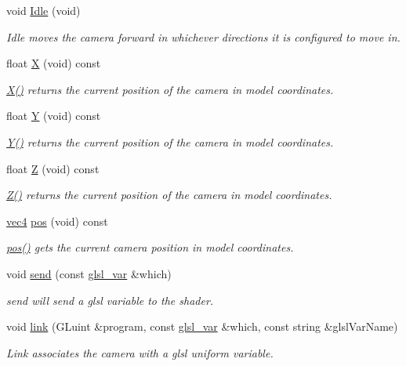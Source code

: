\begin{DoxyCompactItemize}
void \hyperlink{class_camera_aec3559fe43597656629fdb00157d3c73}{\-Idle} (void)
\begin{DoxyCompactList}\small\item\em \-Idle moves the camera forward in whichever directions it is configured to move in. \end{DoxyCompactList}\item 
float \hyperlink{class_camera_a2f7fd64d5d6e0dfb5edcca53c7d15994}{\-X} (void) const 
\begin{DoxyCompactList}\small\item\em \hyperlink{class_camera_a2f7fd64d5d6e0dfb5edcca53c7d15994}{\-X()} returns the current position of the camera in model coordinates. \end{DoxyCompactList}\item 
float \hyperlink{class_camera_a37529ef93871f547ebfd5862bc6cce62}{\-Y} (void) const 
\begin{DoxyCompactList}\small\item\em \hyperlink{class_camera_a37529ef93871f547ebfd5862bc6cce62}{\-Y()} returns the current position of the camera in model coordinates. \end{DoxyCompactList}\item 
float \hyperlink{class_camera_abf1730e47e8e51c76acbddcaa85e2475}{\-Z} (void) const 
\begin{DoxyCompactList}\small\item\em \hyperlink{class_camera_abf1730e47e8e51c76acbddcaa85e2475}{\-Z()} returns the current position of the camera in model coordinates. \end{DoxyCompactList}\item 
\hyperlink{struct_angel_1_1vec4}{vec4} \hyperlink{class_camera_a9982ac5f48fe0af97fefa725080d6da6}{pos} (void) const 
\begin{DoxyCompactList}\small\item\em \hyperlink{class_camera_a9982ac5f48fe0af97fefa725080d6da6}{pos()} gets the current camera position in model coordinates. \end{DoxyCompactList}\item 
void \hyperlink{class_camera_a36cba68c08136242bf5d906f9c0b610c}{send} (const \hyperlink{class_camera_a6ff726a75a430e4f17e5dec42e4d4405}{glsl\-\_\-var} \&which)
\begin{DoxyCompactList}\small\item\em send will send a glsl variable to the shader. \end{DoxyCompactList}\item 
void \hyperlink{class_camera_ab7574214240c67ca774255ef1d7616de}{link} (\-G\-Luint \&program, const \hyperlink{class_camera_a6ff726a75a430e4f17e5dec42e4d4405}{glsl\-\_\-var} \&which, const string \&glsl\-Var\-Name)
\begin{DoxyCompactList}\small\item\em \-Link associates the camera with a glsl uniform variable. \end{DoxyCompactList}\end{DoxyCompactItemize}
